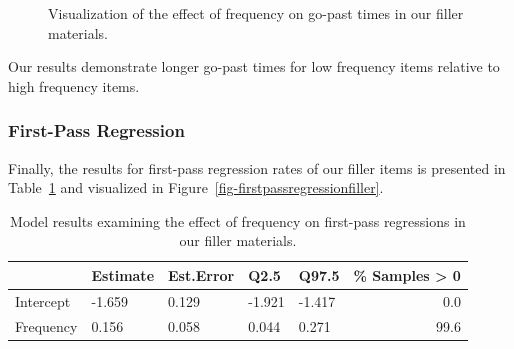 \documentclass[
  letterpaper,
  DIV=11,
  numbers=noendperiod,
  nottoc]{scrreprt}
\begin{document}
\begin{figure}[htbp]


\caption{\label{fig-gopastfiller}Visualization of the effect of
frequency on go-past times in our filler materials.}

\end{figure}%

Our results demonstrate longer go-past times for low frequency items
relative to high frequency items.

\subsubsection{First-Pass Regression}\label{first-pass-regression-1}

Finally, the results for first-pass regression rates of our filler items
is presented in Table~\ref{tbl-firstpassregressionfiller} and visualized
in Figure~\ref{fig-firstpassregressionfiller}.

\begin{longtable}[]{@{}lllllr@{}}

\caption{\label{tbl-firstpassregressionfiller}Model results examining
the effect of frequency on first-pass regressions in our filler
materials.}

\tabularnewline

\toprule\noalign{}
& Estimate & Est.Error & Q2.5 & Q97.5 & \% Samples \textgreater{} 0 \\
\midrule\noalign{}
\endhead
\bottomrule\noalign{}
\endlastfoot
Intercept & -1.659 & 0.129 & -1.921 & -1.417 & 0.0 \\
Frequency & 0.156 & 0.058 & 0.044 & 0.271 & 99.6 \\

\end{longtable}
\end{document}

